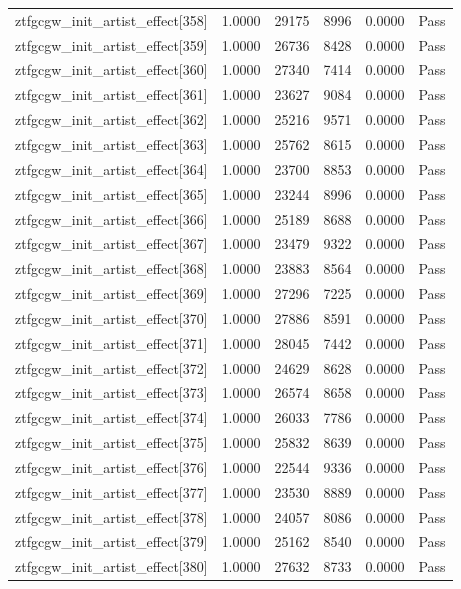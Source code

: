 \begin{table}[htbp]
\begin{tabular}{llrrll}
ztfgcgw\_init\_artist\_effect[358] & 1.0000 & 29175 & 8996 & 0.0000 & Pass \\
ztfgcgw\_init\_artist\_effect[359] & 1.0000 & 26736 & 8428 & 0.0000 & Pass \\
ztfgcgw\_init\_artist\_effect[360] & 1.0000 & 27340 & 7414 & 0.0000 & Pass \\
ztfgcgw\_init\_artist\_effect[361] & 1.0000 & 23627 & 9084 & 0.0000 & Pass \\
ztfgcgw\_init\_artist\_effect[362] & 1.0000 & 25216 & 9571 & 0.0000 & Pass \\
ztfgcgw\_init\_artist\_effect[363] & 1.0000 & 25762 & 8615 & 0.0000 & Pass \\
ztfgcgw\_init\_artist\_effect[364] & 1.0000 & 23700 & 8853 & 0.0000 & Pass \\
ztfgcgw\_init\_artist\_effect[365] & 1.0000 & 23244 & 8996 & 0.0000 & Pass \\
ztfgcgw\_init\_artist\_effect[366] & 1.0000 & 25189 & 8688 & 0.0000 & Pass \\
ztfgcgw\_init\_artist\_effect[367] & 1.0000 & 23479 & 9322 & 0.0000 & Pass \\
ztfgcgw\_init\_artist\_effect[368] & 1.0000 & 23883 & 8564 & 0.0000 & Pass \\
ztfgcgw\_init\_artist\_effect[369] & 1.0000 & 27296 & 7225 & 0.0000 & Pass \\
ztfgcgw\_init\_artist\_effect[370] & 1.0000 & 27886 & 8591 & 0.0000 & Pass \\
ztfgcgw\_init\_artist\_effect[371] & 1.0000 & 28045 & 7442 & 0.0000 & Pass \\
ztfgcgw\_init\_artist\_effect[372] & 1.0000 & 24629 & 8628 & 0.0000 & Pass \\
ztfgcgw\_init\_artist\_effect[373] & 1.0000 & 26574 & 8658 & 0.0000 & Pass \\
ztfgcgw\_init\_artist\_effect[374] & 1.0000 & 26033 & 7786 & 0.0000 & Pass \\
ztfgcgw\_init\_artist\_effect[375] & 1.0000 & 25832 & 8639 & 0.0000 & Pass \\
ztfgcgw\_init\_artist\_effect[376] & 1.0000 & 22544 & 9336 & 0.0000 & Pass \\
ztfgcgw\_init\_artist\_effect[377] & 1.0000 & 23530 & 8889 & 0.0000 & Pass \\
ztfgcgw\_init\_artist\_effect[378] & 1.0000 & 24057 & 8086 & 0.0000 & Pass \\
ztfgcgw\_init\_artist\_effect[379] & 1.0000 & 25162 & 8540 & 0.0000 & Pass \\
ztfgcgw\_init\_artist\_effect[380] & 1.0000 & 27632 & 8733 & 0.0000 & Pass \\

\end{tabular}
\end{table}
